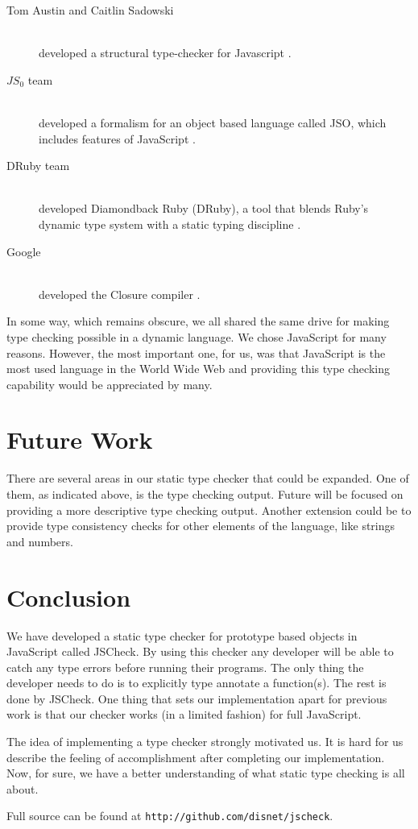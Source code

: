 \documentclass{article}
\begin{document}
\begin{description}
  \item[Tom Austin and Caitlin Sadowski] \hfill \\ 
  developed a structural type-checker for Javascript \cite{fwjsStruct}.
  \item[$JS_0$ team] \hfill \\ 
  developed a formalism for an object based language called JSO, which includes features of JavaScript 
  \cite{typeinferenceforjavascriptEcoop,typecheckingforjavascript}. 
  \item[DRuby team] \hfill \\ 
  developed Diamondback Ruby (DRuby), a tool that blends Ruby's dynamic type 
  system with a static typing discipline \cite{typecheckingruby}.
  \item[Google] \hfill \\ 
  developed the Closure compiler \cite{closureCompiler}.  
\end{description}

In some way, which remains obscure, we all shared the same drive for making type 
checking possible in a dynamic language. We chose JavaScript for many reasons. 
However, the most important one, for us, was that JavaScript is the most used 
language in the World Wide Web and providing this type checking capability would
be appreciated by many. 


\section{Future Work}
\label{sec:future}
There are several areas in our static type checker that could be expanded. One of
them, as indicated above, is the type checking output. Future will be focused on 
providing a more descriptive type checking output. Another extension could be to
provide type consistency checks for other elements of the language, like strings
and numbers.



\section{Conclusion}
\label{sec:conclusion}
We have developed a static type checker for prototype based objects in JavaScript
called JSCheck. By using this checker any developer will be able to catch any 
type errors before running their programs. The only thing the developer needs to
do is to explicitly type annotate a function(s). The rest is done by JSCheck. One 
thing that sets our implementation apart for previous work is that our checker 
works (in a limited fashion) for full JavaScript. 

The idea of implementing a type checker strongly motivated us. It is hard for us 
describe the feeling of accomplishment after completing our implementation. Now,
for sure, we have a better understanding of what static type checking is all about. 

Full source can be found at {\tt http://github.com/disnet/jscheck}.



\end{document}
